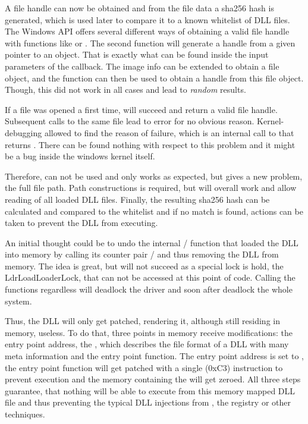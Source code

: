 A file handle can now be obtained and from the file data a sha256 \cite{eckert2014sicherheit} hash is generated, which is used later to compare it to a known whitelist of \gls{DLL} files. The Windows \gls{API} offers several different ways of obtaining a valid file handle with functions like  or . The second function  will generate a handle from a given pointer to an object. That is exactly what can be found inside the input parameters of the  callback. The image info can be extended to obtain a file object, and the  function can then be used to obtain a handle from this file object. Though, this did not work in all cases and lead to \emph{random} results. 

If a file was opened a first time,  will succeed and return a valid file handle. Subsequent calls to the same file lead to error  for no obvious reason. Kernel-debugging allowed to find the reason of failure, which is an internal call to  that returns . There can be found nothing with respect to this problem and it might be a bug inside the windows kernel itself. 

Therefore,  can not be used and only  works as expected, but gives a new problem, the full file path. Path constructions is required, but will overall work and allow reading of all loaded \gls{DLL} files. Finally, the resulting sha256 hash can be calculated and compared to the whitelist and if no match is found, actions can be taken to prevent the \gls{DLL} from executing. 

An initial thought could be to undo the internal / function that loaded the \gls{DLL} into memory by calling its counter pair / and thus removing the \gls{DLL} from memory. The idea is great, but will not succeed as a special lock is hold, the LdrLoadLoaderLock, that can not be accessed at this point of code. Calling the functions regardless will deadlock the driver and soon after deadlock the whole system.

Thus, the \gls{DLL} will only get patched, rendering it, although still residing in memory, useless. To do that, three points in memory receive modifications: the entry point address, the , which describes the file format of a \gls{DLL} with many meta information and the entry point function. The entry point address is set to , the entry point function will get patched with a single  (0xC3) instruction to prevent execution and the memory containing the  will get zeroed. All three steps guarantee, that nothing will be able to execute from this memory mapped \gls{DLL} file and thus preventing the typical \gls{DLL} injections from , the registry or other techniques.